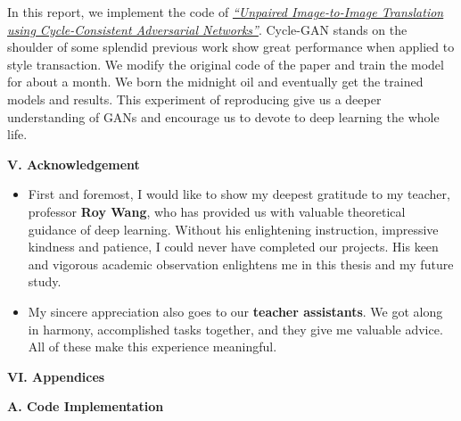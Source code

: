 \documentclass[a4paper]{article}
\begin{document}
In this report, we implement the code of \href{https://arxiv.org/pdf/1703.10593.pdf}{\emph{``Unpaired Image-to-Image Translation using Cycle-Consistent Adversarial Networks''}}. \textsf{Cycle-GAN} stands on the shoulder of some splendid previous work show great performance when applied to style transaction. We modify the original code of the paper and train the model for about a month. We born the midnight oil and eventually get the trained models and results. This experiment of reproducing give us a deeper understanding of \textsf{GANs} and encourage us to devote to deep learning the whole life.

\vspace{1.5cm}
\begin{center}
\LARGE\textbf{V. Acknowledgement} \\
\end{center}
\vspace{.5mm}

\begin{itemize} \item{First and foremost, I would like to show my deepest gratitude to my teacher, professor \textbf{Roy Wang}, who has provided us with valuable theoretical guidance of deep learning. Without his enlightening instruction, impressive kindness and patience, I could never have completed our projects. His keen and vigorous academic observation enlightens me in this thesis and my future study.}
\item{My sincere appreciation also goes to our \textbf{teacher assistants}. We got along in harmony, accomplished tasks together, and they give me valuable advice. All of these make this experience meaningful.}
\end{itemize}

\clearpage
\vspace{5mm}
\begin{center}
\LARGE\textbf{VI. Appendices} \\
\end{center}
\vspace{1mm}

\vspace{5mm}
\begin{center}
\large\textbf{A. Code Implementation} \\
\end{center}


\vspace{2mm}
\large{}
\vspace{1cm}
\end{document}
